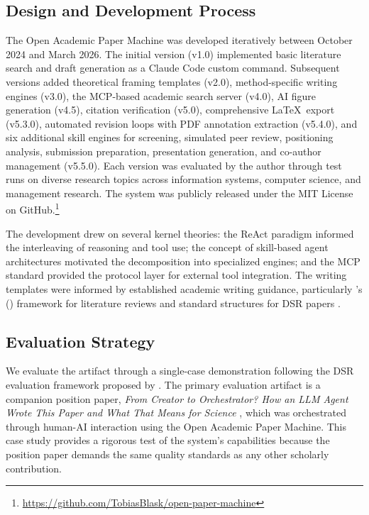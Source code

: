 \documentclass{article}
\begin{document}
\subsection{Design and Development Process}

The Open Academic Paper Machine was developed iteratively between October 2024 and March 2026. The initial version (v1.0) implemented basic literature search and draft generation as a Claude Code custom command. Subsequent versions added theoretical framing templates (v2.0), method-specific writing engines (v3.0), the MCP-based academic search server (v4.0), AI figure generation (v4.5), citation verification (v5.0), comprehensive \LaTeX\ export (v5.3.0), automated revision loops with PDF annotation extraction (v5.4.0), and six additional skill engines for screening, simulated peer review, positioning analysis, submission preparation, presentation generation, and co-author management (v5.5.0). Each version was evaluated by the author through test runs on diverse research topics across information systems, computer science, and management research. The system was publicly released under the MIT License on GitHub.\footnote{\url{https://github.com/TobiasBlask/open-paper-machine}}

The development drew on several kernel theories: the ReAct paradigm \citep{yao2022react} informed the interleaving of reasoning and tool use; the concept of skill-based agent architectures \citep{ferrag2025llm_agents} motivated the decomposition into specialized engines; and the MCP standard provided the protocol layer for external tool integration. The writing templates were informed by established academic writing guidance, particularly \citeauthor{webster2002literature}'s (\citeyear{webster2002literature}) framework for literature reviews and standard structures for DSR papers \citep{peffers2007dsrm,gregor2013positioning}.

\subsection{Evaluation Strategy}

We evaluate the artifact through a single-case demonstration following the DSR evaluation framework proposed by \citet{peffers2007dsrm}. The primary evaluation artifact is a companion position paper, \emph{From Creator to Orchestrator? How an LLM Agent Wrote This Paper and What That Means for Science} \citep{blask2026creator}, which was orchestrated through human-AI interaction using the Open Academic Paper Machine. This case study provides a rigorous test of the system's capabilities because the position paper demands the same quality standards as any other scholarly contribution.
\end{document}
